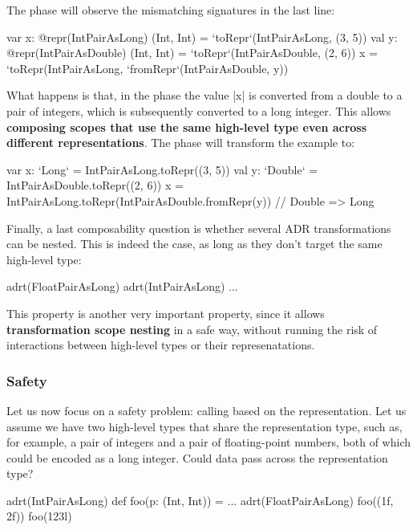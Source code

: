 The \coerce{} phase will observe the mismatching signatures in the last line:

\begin{lstlisting-nobreak}
var x: @repr(IntPairAsLong) (Int, Int) = `toRepr`(IntPairAsLong, (3, 5))
val y: @repr(IntPairAsDouble) (Int, Int) = `toRepr`(IntPairAsDouble, (2, 6))
x = `toRepr(IntPairAsLong, `fromRepr`(IntPairAsDouble, y))
\end{lstlisting-nobreak}

What happens is that, in the \coerce{} phase the value |x| is converted from a double to a pair of integers, which is subsequently converted to a long integer. This allows \textbf{composing scopes that use the same high-level type even across different representations}. The \commit{} phase will transform the example to:

\begin{lstlisting-nobreak}
var x: `Long` = IntPairAsLong.toRepr((3, 5))
val y: `Double` = IntPairAsDouble.toRepr((2, 6))
x = IntPairAsLong.toRepr(IntPairAsDouble.fromRepr(y)) // Double => Long
\end{lstlisting-nobreak}

Finally, a last composability question is whether several ADR transformations can be nested. This is indeed the case, as long as they don't target the same high-level type:

\begin{lstlisting-nobreak}
adrt(FloatPairAsLong) {
  adrt(IntPairAsLong) {
    ...
  }
}
\end{lstlisting-nobreak}

This property is another very important property, since it allows \textbf{transformation scope nesting} in a safe way, without running the risk of interactions between high-level types or their represenatations.

\subsubsection{Safety}

Let us now focus on a safety problem: calling based on the representation. Let us assume we have two high-level types that share the representation type, such as, for example, a pair of integers and a pair of floating-point numbers, both of which could be encoded as a long integer. Could data pass across the representation type?

\begin{lstlisting-nobreak}
adrt(IntPairAsLong) { def foo(p: (Int, Int)) = ... }
adrt(FloatPairAsLong) { foo((1f, 2f)) }
foo(123l)
\end{lstlisting-nobreak}


